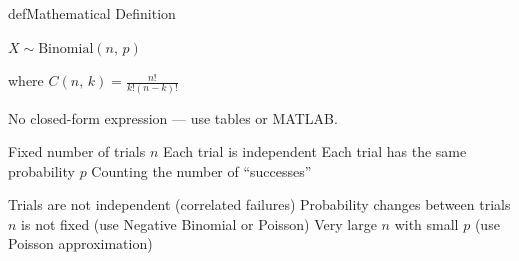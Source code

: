 \begin{PSbox}[unbreakable]{def}{Mathematical Definition}

$X \sim \mathrm{Binomial}(n,\, p)$

\end{PSbox}



where $C(n,\,k) = \frac{n!}{k!(n-k)!}$



No closed-form expression — use tables or MATLAB.






\PSyes{} Fixed number of trials $n$\PSbr{}\PSyes{} Each trial is independent\PSbr{}\PSyes{} Each trial has the same probability $p$\PSbr{}\PSyes{} Counting the number of ``successes''


\PSno{} Trials are not independent (correlated failures)\PSbr{}\PSno{} Probability changes between trials\PSbr{}\PSno{} $n$ is not fixed (use Negative Binomial or Poisson)\PSbr{}\PSno{} Very large $n$ with small $p$ (use Poisson approximation)



